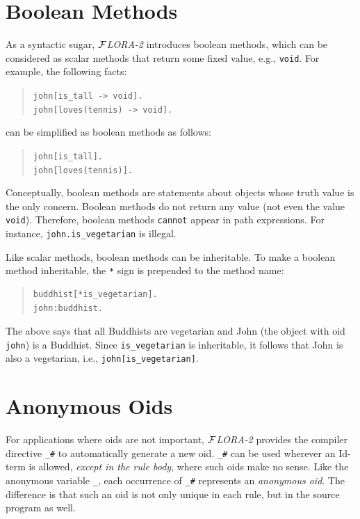 \documentclass[11pt]{article}
\newcommand{\FLORA}{{\mbox{${\cal F}${\small\it LORA}\rm\emph{-2}}}\xspace}
\begin{document}
\section{Boolean Methods}


%
As a syntactic sugar, \FLORA introduces boolean methods, which can be
considered as scalar methods that return some fixed value, e.g.,
{\tt void}. For example, the following facts:
\begin{quote}
\verb|john[is_tall -> void].| \\
\verb|john[loves(tennis) -> void].|
\end{quote}
can be simplified as boolean methods as follows:
\begin{quote}
\verb|john[is_tall].| \\
\verb|john[loves(tennis)].|
\end{quote}

Conceptually, boolean methods are statements about objects whose truth
value is the only concern. Boolean methods do not return any value (not
even the value {\tt void}). Therefore, boolean methods {\tt cannot} appear
in path expressions. For instance, \mbox{\tt john.is\_vegetarian} is
illegal.

Like scalar methods, boolean methods can be inheritable. To make a
boolean method inheritable, the \verb|*| sign is prepended to
the method name:
\begin{quote}
\begin{verbatim}
buddhist[*is_vegetarian].
john:buddhist.
\end{verbatim}
\end{quote}
The above says that all Buddhists are vegetarian and John (the object with
oid {\tt john}) is a Buddhist. Since \verb|is_vegetarian| is inheritable,
it follows that John is also a vegetarian, i.e.,
\verb|john[is_vegetarian]|.


\section{Anonymous Oids}


%
For applications where oids are not important, \FLORA provides the
compiler directive \verb|_#| to automatically generate a new
oid. \verb|_#| can be used wherever an Id-term is allowed, \emph{except in the
rule body}, where such oids make no sense. Like the
anonymous variable \verb|_|, each occurrence of \verb|_#| represents
an \emph{anonymous oid}. The difference is that such an oid is not only
unique in each rule, but in the source program as well.
\end{document}
